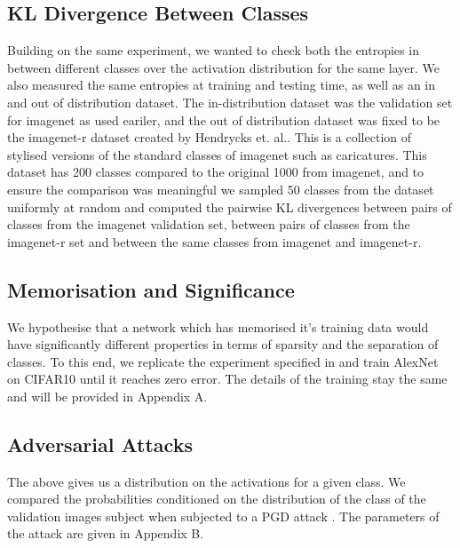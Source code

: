 \documentclass{article}
\begin{document}
        \subsection{KL Divergence Between Classes}
            Building on the same experiment, we wanted to check both the entropies in between different classes over the activation distribution for the same layer. We also measured the same entropies at training and testing time, as well as an in and out of distribution dataset. The in-distribution dataset was the validation set for imagenet as used eariler, and the out of distribution dataset was fixed to be the imagenet-r dataset created by Hendrycks et. al.\cite{hendrycks2021facesrobustnesscriticalanalysis}. This is a collection of stylised versions of the standard classes of imagenet such as caricatures. This dataset has 200 classes compared to the original 1000 from imagenet, and to ensure the comparison was meaningful we sampled 50 classes from the dataset uniformly at random and computed the pairwise KL divergences between pairs of classes from the imagenet validation set, between pairs of classes from the imagenet-r set and between the same classes from imagenet and imagenet-r. 
        
        \subsection{Memorisation and Significance}
            We hypothesise that a network which has memorised it's training data would have significantly different properties in terms of sparsity and the separation of classes. To this end, we replicate the experiment specified in \cite{zhang2017understandingdeeplearningrequires} and train AlexNet on CIFAR10 until it reaches zero error. The details of the training stay the same and will be provided in Appendix A. 
        
        \subsection{Adversarial Attacks}
            The above gives us a distribution on the activations for a given class. We compared the probabilities conditioned on the distribution of the class of the validation images subject when subjected to a PGD attack \cite{madry2019deeplearningmodelsresistant}. The parameters of the attack are given in Appendix B. 
        
\end{document}
